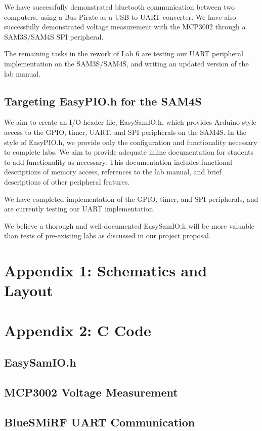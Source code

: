 \documentclass[12pt]{article}
\begin{document}
We have successfully demonstrated bluetooth communication between two computers, using a Bus Pirate as a USB to UART converter. We have also successfully demonstrated voltage measurement with the MCP3002 through a SAM3S/SAM4S SPI peripheral.

The remaining tasks in the rework of Lab 6 are testing our UART peripheral implementation on the SAM3S/SAM4S, and writing an updated version of the lab manual.

\subsection{Targeting EasyPIO.h for the SAM4S}

We aim to create an I/O header file, EasySamIO.h, which provides Arduino-style access to the GPIO, timer, UART, and SPI peripherals on the SAM4S. In the style of EasyPIO.h, we provide only the configuration and functionality necessary to complete labs. We aim to provide adequate inline documentation for students to add functionality as necessary. This documentation includes functional descriptions of memory access, references to the lab manual, and brief descriptions of other peripheral features.

We have completed implementation of the GPIO, timer, and SPI peripherals, and are currently testing our UART implementation.

We believe a thorough and well-documented EasySamIO.h will be more valuable than tests of pre-existing labs as discussed in our project proposal.

\clearpage
\section{Appendix 1: Schematics and Layout}
\clearpage
\section{Appendix 2: C Code}
\subsection{EasySamIO.h}
\subsection{MCP3002 Voltage Measurement}
\subsection{BlueSMiRF UART Communication}
	
\end{document}
